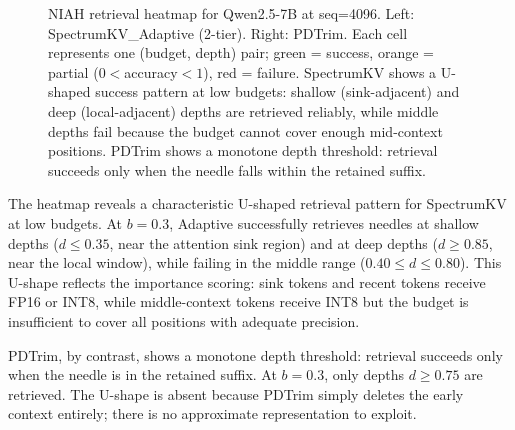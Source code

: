 \documentclass[11pt]{article}
\newcommand{\method}{SpectrumKV}
\newcommand{\budget}{b}
\theoremstyle{plain}
\theoremstyle{definition}
\begin{document}
\begin{figure}[t]
\caption{NIAH retrieval heatmap for Qwen2.5-7B at seq=4096.  Left: \method{}\_Adaptive (2-tier).  Right: PDTrim.  Each cell represents one (budget, depth) pair; green = success, orange = partial ($0 < $accuracy$ < 1$), red = failure.  \method{} shows a U-shaped success pattern at low budgets: shallow (sink-adjacent) and deep (local-adjacent) depths are retrieved reliably, while middle depths fail because the budget cannot cover enough mid-context positions.  PDTrim shows a monotone depth threshold: retrieval succeeds only when the needle falls within the retained suffix.}
\label{fig:niah-heatmap}
\end{figure}

The heatmap reveals a characteristic U-shaped retrieval pattern for \method{} at low budgets.  At $\budget=0.3$, Adaptive successfully retrieves needles at shallow depths ($d \le 0.35$, near the attention sink region) and at deep depths ($d \ge 0.85$, near the local window), while failing in the middle range ($0.40 \le d \le 0.80$).  This U-shape reflects the importance scoring: sink tokens and recent tokens receive FP16 or INT8, while middle-context tokens receive INT8 but the budget is insufficient to cover all positions with adequate precision.

PDTrim, by contrast, shows a monotone depth threshold: retrieval succeeds only when the needle is in the retained suffix.  At $\budget=0.3$, only depths $d \ge 0.75$ are retrieved.  The U-shape is absent because PDTrim simply deletes the early context entirely; there is no approximate representation to exploit.
\end{document}
